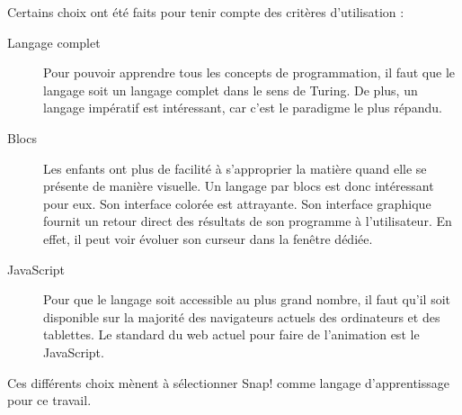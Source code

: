 Certains choix ont été faits pour tenir compte des critères d'utilisation :
\begin{description}
  \item[Langage complet] Pour pouvoir apprendre tous les concepts de programmation, il faut que le langage soit un langage complet dans le sens de Turing.  De plus, un langage impératif est intéressant, car c'est le paradigme le plus répandu.
  \item[Blocs] Les enfants ont plus de facilité à s'approprier la matière quand elle se présente de manière visuelle. %
  Un langage par blocs est donc intéressant pour eux. Son interface colorée est attrayante. Son interface graphique fournit un retour direct des résultats de son programme à l'utilisateur. En effet, il peut voir évoluer son curseur dans la fenêtre dédiée.
  \item[JavaScript] Pour que le langage soit accessible au plus grand nombre, il faut qu'il soit disponible sur la majorité des navigateurs actuels des ordinateurs et des tablettes. Le standard du web actuel pour faire de l'animation est le JavaScript.
\end{description}
Ces différents choix mènent à sélectionner Snap! comme langage d'apprentissage pour ce travail.


